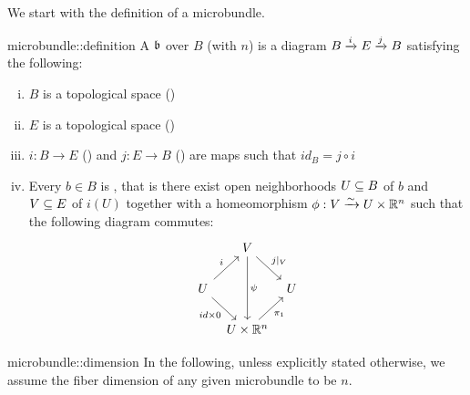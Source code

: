 \begin{myparagraph}
    We start with the definition of a microbundle.
\end{myparagraph}

\begin{mydefinition}[microbundle]{microbundle::definition}
    A  $\bb$ over $B$ (with  $n$)
    is a diagram $\bundle{B}{E}{i}{j}$ satisfying the following:
    \begin{enumerate}[(i)]
        \item $B$ is a topological space ()
        \item $E$ is a topological space ()
        \item $i: B \to E$ () and $j: E \to B$ ()
        are maps such that $id_B = j \circ i$
        \item Every $b \in B$ is ,
        that is there exist open neighborhoods $U \sub B$ of $b$ and $V \sub E$ of $i(U)$
        together with a homeomorphism $\phi: V \isomto U \times \R^n$ such that the following diagram commutes:
        \[
            \begin{tikzcd}[column sep=tiny]
                & V \ar[dr, "j\vert_V"] \ar[dd, "\psi"] & \\
                U \ar[ur, "i"] \ar[dr, "{id \times 0}"'] & & U \\
                & U \times\R^n \ar[ur, "\pi_1"'] &
            \end{tikzcd}
        \]
    \end{enumerate}
\end{mydefinition}

\begin{myremark}{microbundle::dimension}
    In the following, unless explicitly stated otherwise,
    we assume the fiber dimension of any given microbundle to be $n$.
\end{myremark}